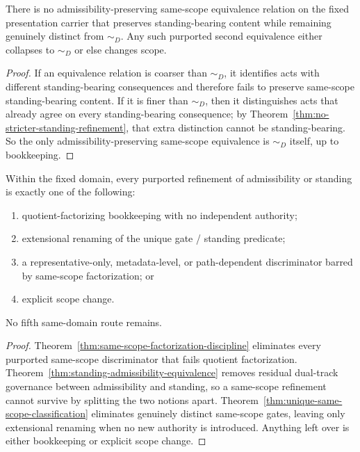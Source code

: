 \begin{corollary}
There is no admissibility-preserving same-scope equivalence relation on the fixed presentation carrier that preserves standing-bearing content while remaining genuinely distinct from $\sim_D$. Any such purported second equivalence either collapses to $\sim_D$ or else changes scope.
\end{corollary}

\begin{proof}
If an equivalence relation is coarser than $\sim_D$, it identifies acts with different standing-bearing consequences and therefore fails to preserve same-scope standing-bearing content. If it is finer than $\sim_D$, then it distinguishes acts that already agree on every standing-bearing consequence; by Theorem~\ref{thm:no-stricter-standing-refinement}, that extra distinction cannot be standing-bearing. So the only admissibility-preserving same-scope equivalence is $\sim_D$ itself, up to bookkeeping.\cite{MaleyTrajectory,MaleyATS}
\end{proof}

\begin{corollary}
\label{cor:discriminator-route-exhaustion}
Within the fixed domain, every purported refinement of admissibility or standing is exactly one of the following:
\begin{enumerate}
  \item quotient-factorizing bookkeeping with no independent authority;
  \item extensional renaming of the unique gate / standing predicate;
  \item a representative-only, metadata-level, or path-dependent discriminator barred by same-scope factorization; or
  \item explicit scope change.
\end{enumerate}
No fifth same-domain route remains.
\end{corollary}

\begin{proof}
Theorem~\ref{thm:same-scope-factorization-discipline} eliminates every purported same-scope discriminator that fails quotient factorization. Theorem~\ref{thm:standing-admissibility-equivalence} removes residual dual-track governance between admissibility and standing, so a same-scope refinement cannot survive by splitting the two notions apart. Theorem~\ref{thm:unique-same-scope-classification} eliminates genuinely distinct same-scope gates, leaving only extensional renaming when no new authority is introduced. Anything left over is either bookkeeping or explicit scope change.\cite{MaleyExhaustion,MaleyATS,MaleyStandingEquivalence}
\end{proof}

